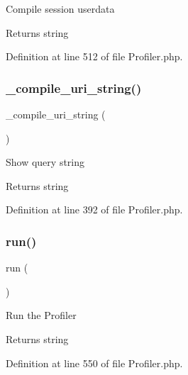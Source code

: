 Compile session userdata

\begin{DoxyReturn}{Returns}
string 
\end{DoxyReturn}


Definition at line 512 of file Profiler.\+php.

\mbox{\label{class_c_i___profiler_a781803c49bf0c92d47187c76ebb42a1b}} 
\subsubsection{\texorpdfstring{\_compile\_uri\_string()}{\_compile\_uri\_string()}}
{\footnotesize\ttfamily \+\_\+compile\+\_\+uri\+\_\+string (\begin{DoxyParamCaption}{ }\end{DoxyParamCaption})\hspace{0.3cm}{\ttfamily [protected]}}

Show query string

\begin{DoxyReturn}{Returns}
string 
\end{DoxyReturn}


Definition at line 392 of file Profiler.\+php.

\mbox{\label{class_c_i___profiler_afb0fafe7e02a3ae1993c01c19fad2bae}} 
\subsubsection{\texorpdfstring{run()}{run()}}
{\footnotesize\ttfamily run (\begin{DoxyParamCaption}{ }\end{DoxyParamCaption})}

Run the Profiler

\begin{DoxyReturn}{Returns}
string 
\end{DoxyReturn}


Definition at line 550 of file Profiler.\+php.

\mbox{\label{class_c_i___profiler_a81c587d7a2a249d05f28c96a135591f7}} 
